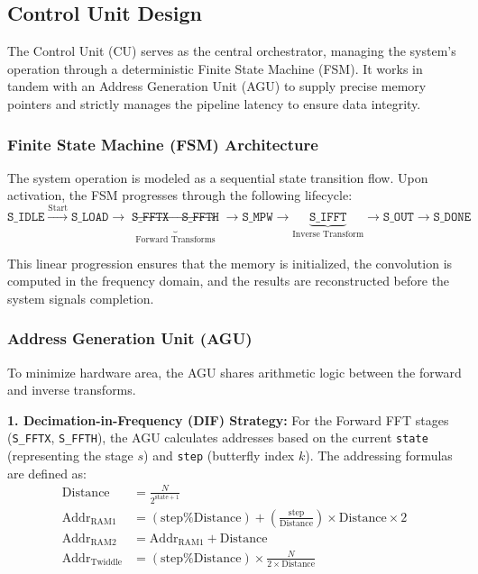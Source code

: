 \subsection{Control Unit Design}

The Control Unit (CU) serves as the central orchestrator, managing the system's operation through a deterministic Finite State Machine (FSM). It works in tandem with an Address Generation Unit (AGU) to supply precise memory pointers and strictly manages the pipeline latency to ensure data integrity.

\subsubsection{Finite State Machine (FSM) Architecture}
The system operation is modeled as a sequential state transition flow. Upon activation, the FSM progresses through the following lifecycle:
\begin{equation*}
    \texttt{S\_IDLE} \xrightarrow{\text{Start}} \texttt{S\_LOAD} \xrightarrow{} \underbrace{\texttt{S\_FFTX} \to \texttt{S\_FFTH}}_{\text{Forward Transforms}} \xrightarrow{} \texttt{S\_MPW} \xrightarrow{} \underbrace{\texttt{S\_IFFT}}_{\text{Inverse Transform}} \xrightarrow{} \texttt{S\_OUT} \to \texttt{S\_DONE}
\end{equation*}

This linear progression ensures that the memory is initialized, the convolution is computed in the frequency domain, and the results are reconstructed before the system signals completion.

\subsubsection{Address Generation Unit (AGU)}
To minimize hardware area, the AGU shares arithmetic logic between the forward and inverse transforms.

\textbf{1. Decimation-in-Frequency (DIF) Strategy:}
For the Forward FFT stages (\texttt{S\_FFTX}, \texttt{S\_FFTH}), the AGU calculates addresses based on the current \texttt{state} (representing the stage $s$) and \texttt{step} (butterfly index $k$). The addressing formulas are defined as:
\begin{align}
    \text{Distance} &= \frac{N}{2^{\text{state} + 1}} \\
    \text{Addr}_{\text{RAM1}} &= (\text{step} \% \text{Distance}) + \left( \frac{\text{step}}{\text{Distance}} \right) \times \text{Distance} \times 2 \\
    \text{Addr}_{\text{RAM2}} &= \text{Addr}_{\text{RAM1}} + \text{Distance} \\
    \text{Addr}_{\text{Twiddle}} &= (\text{step} \% \text{Distance}) \times \frac{N}{2 \times \text{Distance}}
\end{align}

